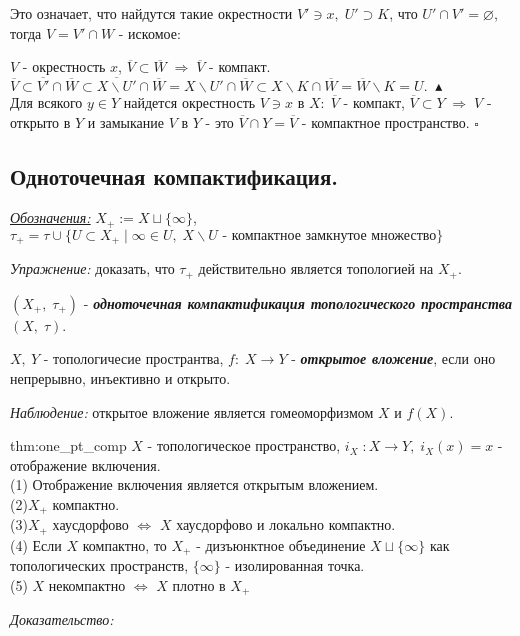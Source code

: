 \documentclass[../../main.tex]{subfiles}
\begin{document}
Это означает, что найдутся такие окрестности $V'\ni x,\; U'\supset K$, что $U'\cap V' = \varnothing$, тогда $V = V'\cap W$ - искомое:

$V$ - окрестность $x$, $\overline V \subset \overline W\; \Rightarrow\; \overline V$ - компакт. $\overline V \subset \overline {V'}\cap \overline W \subset \overline{X\backslash U'} \cap \overline W = X\backslash U'\cap \overline W \subset X\backslash K\cap \overline W = \overline W\backslash K = U.\; \blacktriangle$ \\
Для всякого $y\in Y$ найдется окрестность  $V\ni x$ в $X:\;\overline V$ - компакт, $\overline V \subset Y\;\Rightarrow\; V$ - открыто в $Y$ и замыкание $V$ в $Y$ - это $\overline{V} \cap Y = \overline{V}$ - компактное пространство. $\square$

\subsection{Одноточечная компактификация.}
\textit{\underline{Обозначения:}} $X_+:=X\sqcup \{\infty\}$, $\tau_+ = \tau \cup \{U\subset X_+\; | \; \infty\in U,\;X\backslash U \text{ - компактное замкнутое множество}\}$

\textit{Упражнение:} доказать, что $\tau_+$ действительно является топологией на $X_+$.

 $(X_+,\;\tau_+)$ - \textbf{\textit{одноточечная компактификация топологического пространства}} $(X,\;\tau)$.

 $X,\ Y$ - топологичесие пространтва, $f:\;X\rightarrow Y$ - \textbf{\textit{открытое вложение}}, если оно непрерывно, инъективно и открыто.

\textit{Наблюдение:} открытое вложение является гомеоморфизмом $X$ и $f(X)$.

\begin{theo}[]{thm:one_pt_comp}
$X$ - топологическое пространство, $i_X\; :X\rightarrow Y,\; i_X(x) = x$ - отображение включения.\\
(1) Отображение включения является открытым вложением.\\
(2)$X_+$ компактно.\\
(3)$X_+$ хаусдорфово $\Leftrightarrow$ $X$ хаусдорфово и локально компактно.\\
(4) Если $X$ компактно, то $X_+$ - дизъюнктное объединение $X\sqcup\{\infty\}$ как топологических пространств, $\{\infty\}$ - изолированная точка.\\
(5) $X$ некомпактно $\Leftrightarrow$ $X$ плотно в $X_+$

\end{theo}
\textit{Доказательство:}
\end{document}

